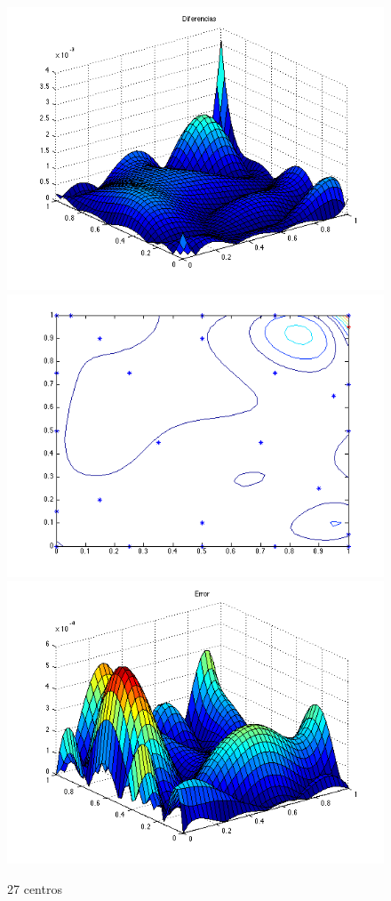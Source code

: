 \documentclass[11pt,a4paper]{article}
\begin{document}
\begin{figure}[H]
\centering

\includegraphics[scale=0.35]{diferencias27.png}
\includegraphics[scale=0.35]{centros27.png}
\includegraphics[scale=0.35]{error27.png}
\caption{27 centros}
\end{figure}
\end{document}
